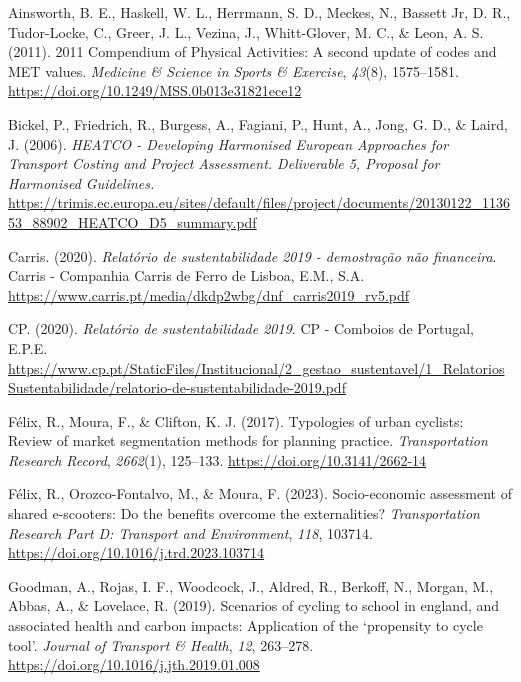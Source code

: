 \documentclass[review, doubleblind, 3p,
authoryear]{elsarticle} %
\newlength{\cslhangindent}
\newlength{\cslentryspacingunit} %
\newenvironment{CSLReferences}[2] %
 {%
  \setlength{\parindent}{0pt}
  \ifodd #1
  \let\oldpar\par
  \def\par{\hangindent=\cslhangindent\oldpar}
  \fi
  \setlength{\parskip}{#2\cslentryspacingunit}
 }%
 {}
\begin{document}
\hypertarget{refs}{}
\begin{CSLReferences}{1}{0}
\leavevmode{}%
Ainsworth, B. E., Haskell, W. L., Herrmann, S. D., Meckes, N., Bassett
Jr, D. R., Tudor-Locke, C., Greer, J. L., Vezina, J., Whitt-Glover, M.
C., \& Leon, A. S. (2011). {2011 Compendium of Physical Activities: A
second update of codes and MET values}. \emph{Medicine \& Science in
Sports \& Exercise}, \emph{43}(8), 1575--1581.
\url{https://doi.org/10.1249/MSS.0b013e31821ece12}

\leavevmode{}%
Bickel, P., Friedrich, R., Burgess, A., Fagiani, P., Hunt, A., Jong, G.
D., \& Laird, J. (2006). \emph{{HEATCO - Developing Harmonised European
Approaches for Transport Costing and Project Assessment. Deliverable 5,
Proposal for Harmonised Guidelines.}}
\url{https://trimis.ec.europa.eu/sites/default/files/project/documents/20130122_113653_88902_HEATCO_D5_summary.pdf}

\leavevmode{}%
Carris. (2020). \emph{Relatório de sustentabilidade 2019 - demostração
não financeira}. {Carris - Companhia Carris de Ferro de Lisboa, E.M.,
S.A.} \url{https://www.carris.pt/media/dkdp2wbg/dnf_carris2019_rv5.pdf}

\leavevmode{}%
CP. (2020). \emph{Relatório de sustentabilidade 2019}. {CP - Comboios de
Portugal, E.P.E.}
\url{https://www.cp.pt/StaticFiles/Institucional/2_gestao_sustentavel/1_RelatoriosSustentabilidade/relatorio-de-sustentabilidade-2019.pdf}

\leavevmode{}%
Félix, R., Moura, F., \& Clifton, K. J. (2017). Typologies of urban
cyclists: Review of market segmentation methods for planning practice.
\emph{Transportation Research Record}, \emph{2662}(1), 125--133.
\url{https://doi.org/10.3141/2662-14}

\leavevmode{}%
Félix, R., Orozco-Fontalvo, M., \& Moura, F. (2023). Socio-economic
assessment of shared e-scooters: Do the benefits overcome the
externalities? \emph{Transportation Research Part D: Transport and
Environment}, \emph{118}, 103714.
\url{https://doi.org/10.1016/j.trd.2023.103714}

\leavevmode{}%
Goodman, A., Rojas, I. F., Woodcock, J., Aldred, R., Berkoff, N.,
Morgan, M., Abbas, A., \& Lovelace, R. (2019). Scenarios of cycling to
school in england, and associated health and carbon impacts: Application
of the {`}propensity to cycle tool{'}. \emph{Journal of Transport \&
Health}, \emph{12}, 263--278.
\url{https://doi.org/10.1016/j.jth.2019.01.008}


\end{CSLReferences}
\end{document}
